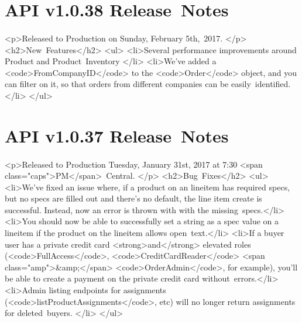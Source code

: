 \documentclass{memoir}%
\begin{document}
%
\section*{API v1.0.38 Release~Notes}%
\paragraph*{}%

%
\paragraph*{}%
<p>Released to Production on Sunday, February 5th,~2017. </p>\newline%
<h2>New~Features</h2>\newline%
<ul>\newline%
<li>Several performance improvements around Product and Product~Inventory </li>\newline%
<li>We’ve added a <code>FromCompanyID</code> to the <code>Order</code> object, and you can filter on it, so that orders from different companies can be easily~identified.</li>\newline%
</ul>

%
\section*{API v1.0.37 Release~Notes}%
\paragraph*{}%

%
\paragraph*{}%
<p>Released to Production Tuesday, January 31st, 2017 at 7:30 <span class="caps">PM</span>~Central. </p>\newline%
<h2>Bug~Fixes</h2>\newline%
<ul>\newline%
<li>We’ve fixed an issue where, if a product on an lineitem has required specs, but no specs are filled out and there’s no default, the line item create is successful. Instead, now an error is thrown with with the missing~specs.</li>\newline%
<li>You should now be able to successfully set a string as a spec value on a lineitem if the product on the lineitem allows open~text.</li>\newline%
<li>If a buyer user has a private credit card <strong>and</strong> elevated roles (<code>FullAccess</code>, <code>CreditCardReader</code> <span class="amp">\&amp;</span> <code>OrderAdmin</code>, for example), you’ll be able to create a payment on the private credit card without~errors.</li>\newline%
<li>Admin listing endpoints for assignments (<code>listProductAssignments</code>, etc) will no longer return assignments for deleted~buyers. </li>\newline%
</ul>
\end{document}
